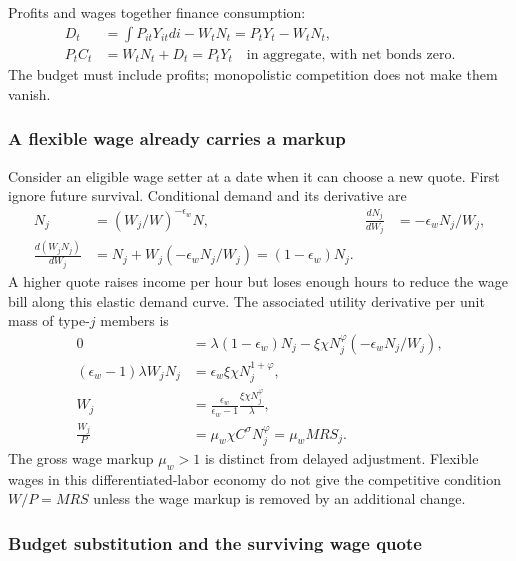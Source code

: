 Profits and wages together finance consumption:
\begin{align}
 D_t&=\int P_{it}Y_{it}di-W_tN_t=P_tY_t-W_tN_t,\\
 P_tC_t&=W_tN_t+D_t=P_tY_t
                  \quad\text{in aggregate, with net bonds zero}.
\end{align}
The budget must include profits; monopolistic competition does not make them
vanish.

\subsubsection{A flexible wage already carries a markup}

Consider an eligible wage setter at a date when it can choose a new quote.
First ignore future survival. Conditional demand and its derivative are
\begin{align}
 N_j&=(W_j/W)^{-\epsilon_w}N,
 &\frac{dN_j}{dW_j}&=-\epsilon_wN_j/W_j,\\
 \frac{d(W_jN_j)}{dW_j}
 &=N_j+W_j(-\epsilon_wN_j/W_j)=(1-\epsilon_w)N_j.
\end{align}
A higher quote raises income per hour but loses enough hours to reduce the
wage bill along this elastic demand curve. The associated utility derivative
per unit mass of type-$j$ members is
\begin{align}
 0&=\lambda(1-\epsilon_w)N_j
           -\xi\chi N_j^\varphi(-\epsilon_wN_j/W_j),\\
 (\epsilon_w-1)\lambda W_jN_j
 &=\epsilon_w\xi\chi N_j^{1+\varphi},\\
 W_j&=\frac{\epsilon_w}{\epsilon_w-1}
                        \frac{\xi\chi N_j^\varphi}{\lambda},\\
 \frac{W_j}{P}&=\mu_w\chi C^\sigma N_j^\varphi=\mu_w MRS_j.
 \label{eq:sw-flex-wage}
\end{align}
The gross wage markup $\mu_w>1$ is distinct from delayed adjustment. Flexible
wages in this differentiated-labor economy do not give the competitive
condition $W/P=MRS$ unless the wage markup is removed by an additional change.

\subsubsection{Budget substitution and the surviving wage quote}


